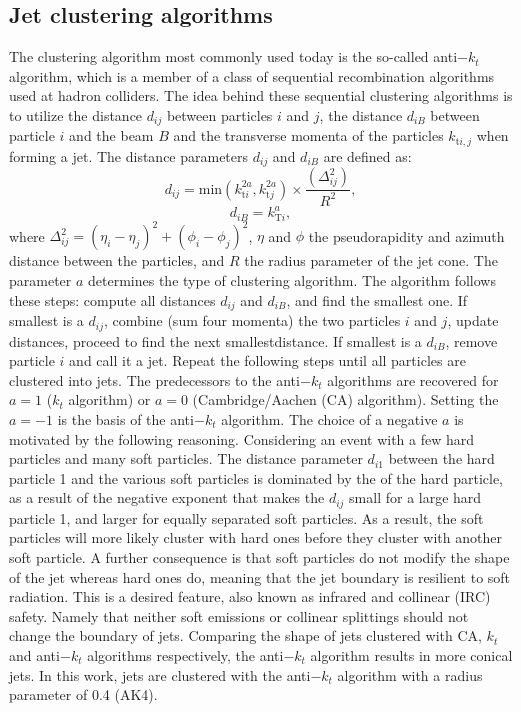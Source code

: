 \subsection{Jet clustering algorithms}
The clustering algorithm most commonly used today is the so-called anti$-k_t$ algorithm\cite{Cacciari:2008gp}, which is a member of a class of sequential recombination algorithms used at hadron colliders. 
The idea behind these sequential clustering algorithms is to utilize the distance $d_{ij}$ between particles $i$ and $j$, the distance $d_{iB}$ between particle $i$ and the beam $B$ and the transverse momenta of the particles $k_{\mathrm{t}i,j}$ when forming a jet. 
The distance parameters $d_{ij}$ and $d_{iB}$ are defined as:
\begin{equation}
d_{ij}=\mathrm{min}(k_{\mathrm{t}i}^{2a}, k_{\mathrm{t}j}^{2a})\times\frac{(\Delta_{ij}^{2})}{R^{2}},
\end{equation}
\begin{equation}
d_{iB}=k_{\mathrm{T}i}^{a},
\end{equation}
where $\Delta_{ij}^{2}=(\eta_{i}-\eta_{j})^{2}+(\phi_{i}-\phi_{j})^{2}$, $\eta$ and $\phi$ the pseudorapidity and azimuth distance between the particles, and $R$ the radius parameter of the jet cone.
The parameter $a$ determines the type of clustering algorithm. 
The algorithm follows these steps: compute all distances $d_{ij}$ and $d_{iB}$, and find the smallest one. 
If smallest is a $d_{ij}$, combine (sum four momenta) the two particles $i$ and $j$, update distances, proceed to find the next smallestdistance. 
If smallest is a $d_{iB}$, remove particle $i$ and call it a jet. Repeat the following steps until all particles are clustered into jets. 
The predecessors to the anti$-k_t$ algorithms are recovered for $a=1$ ($k_{t}$ algorithm\cite{Salam:2009jx}) or $a=0$ (Cambridge/Aachen (CA) algorithm\cite{Dokshitzer:1997in}).  
Setting the $a=-1$ is the basis of the anti$-k_t$ algorithm. 
The choice of a negative $a$ is motivated by the following reasoning. 
Considering an event with a few hard particles and many soft particles. 
The distance parameter $d_{i1}$ between the hard particle 1 and the various soft particles is dominated by the \pt of the hard particle, as a result of the negative exponent that makes the $d_{ij}$ small for a large \pt hard particle 1, and larger for equally separated soft particles. 
As a result, the soft particles will more likely cluster with hard ones before they cluster with another soft particle. 
A further consequence is that soft particles do not modify the shape of the jet whereas hard ones do, meaning that the jet boundary is resilient to soft radiation. 
This is a desired feature, also known as infrared and collinear (IRC) safety. Namely that neither soft emissions or collinear splittings should not change the boundary of jets. 
Comparing the shape of jets clustered with CA, $k_t$ and anti$-k_t$ algorithms respectively, the anti$-k_t$ algorithm results in more conical jets.
In this work, jets are clustered with the anti$-k_t$ algorithm with a radius parameter of 0.4 (AK4). 
